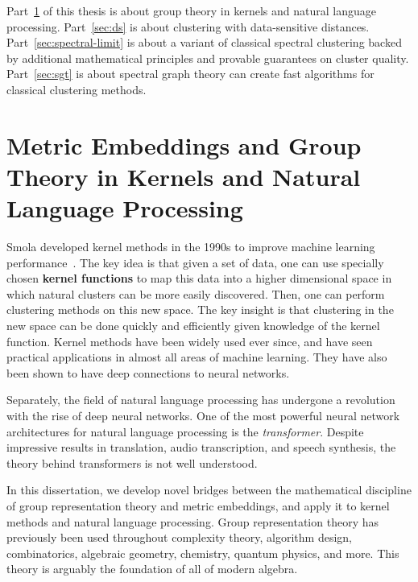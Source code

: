 Part~\ref{sec:group} of this thesis is about group theory in kernels and natural language
processing. Part~\ref{sec:ds} is about clustering with
data-sensitive distances. Part~\ref{sec:spectral-limit} is about
a variant of classical spectral clustering
backed by additional mathematical principles and provable guarantees on
cluster quality. Part~\ref{sec:sgt} is about spectral graph
theory can create fast algorithms for classical clustering methods.

\section{Metric Embeddings and Group Theory in Kernels and Natural Language
  Processing}\label{sec:group}
  Smola developed kernel methods in the 1990s to improve machine
  learning performance~\cite{s96}. The key idea is that given a set of data, one
  can use specially chosen \textbf{kernel functions} to map this data into a higher dimensional space in
  which natural clusters can be more easily discovered. Then, one can perform clustering
  methods on this new space. The key insight is that clustering in the
  new space can be done quickly and efficiently given knowledge of the
  kernel function. Kernel methods have been widely used ever since, and
  have seen practical applications in almost all areas of machine
  learning. They have also been shown to have deep connections to
  neural networks.

  Separately, the field of natural language processing has undergone a
  revolution with the rise of deep neural networks. One of the most
  powerful neural network architectures for natural language processing is the
  \textit{transformer}. Despite impressive
  results in translation, audio transcription, and
  speech synthesis, the theory behind transformers is not well understood. 

  In this dissertation, we develop novel bridges between the
  mathematical discipline of group representation theory and metric
  embeddings, and apply it
  to kernel methods and natural language processing.  Group
  representation theory has previously been used throughout complexity theory, algorithm design,
  combinatorics, algebraic geometry, chemistry, quantum physics, and
  more. This theory is arguably the foundation of all of modern
  algebra.

